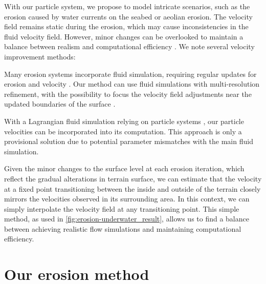 With our particle system, we propose to model intricate scenarios, such as the erosion caused by water currents on the seabed or aeolian erosion. The velocity field remains static during the erosion, which may cause inconsistencies in the fluid velocity field. However, minor changes can be overlooked to maintain a balance between realism and computational efficiency \cite{Tychonievich2010}. We note several velocity improvement methods: 
\begin{Itemize}
     Many erosion systems incorporate fluid simulation, requiring regular updates for erosion and velocity \cite{Kristof2009, Wojtan2007}. Our method can use fluid simulations with multi-resolution refinement, with the possibility to focus the velocity field adjustments near the updated boundaries of the surface \cite{Roose2011}. 
    
     With a Lagrangian fluid simulation relying on particle systems \cite{Koschier2022}, our particle velocities can be incorporated into its computation. This approach is only a provisional solution due to potential parameter mismatches with the main fluid simulation. 

     Given the minor changes to the surface level at each erosion iteration, which reflect the gradual alterations in terrain surface, we can estimate that the velocity at a fixed point transitioning between the inside and outside of the terrain closely mirrors the velocities observed in its surrounding area. In this context, we can simply interpolate the velocity field at any transitioning point. This simple method, as used in \cref{fig:erosion-underwater_result}, allows us to find a balance between achieving realistic flow simulations and maintaining computational efficiency.
\end{Itemize}

\section{Our erosion method}
\label{sec:erosion-application-on-representations}


